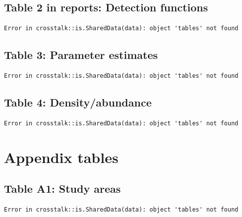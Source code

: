 \documentclass[
]{book}
\begin{document}
\hypertarget{table-2-in-reports-detection-functions}{%
\subsection*{Table 2 in reports: Detection functions}\label{table-2-in-reports-detection-functions}}

\begin{verbatim}
Error in crosstalk::is.SharedData(data): object 'tables' not found
\end{verbatim}

\hypertarget{table-3-parameter-estimates}{%
\subsection*{Table 3: Parameter estimates}\label{table-3-parameter-estimates}}

\begin{verbatim}
Error in crosstalk::is.SharedData(data): object 'tables' not found
\end{verbatim}

\hypertarget{table-4-densityabundance}{%
\subsection*{Table 4: Density/abundance}\label{table-4-densityabundance}}

\begin{verbatim}
Error in crosstalk::is.SharedData(data): object 'tables' not found
\end{verbatim}

\hypertarget{appendix-tables}{%
\section*{Appendix tables}\label{appendix-tables}}

\hypertarget{table-a1-study-areas}{%
\subsection*{Table A1: Study areas}\label{table-a1-study-areas}}

\begin{verbatim}
Error in crosstalk::is.SharedData(data): object 'tables' not found
\end{verbatim}
\end{document}
